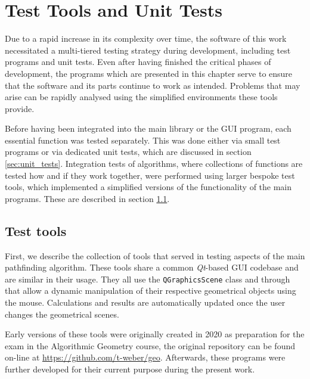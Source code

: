 %
%

\chapter{Test Tools and Unit Tests}
\label{ch:tests}
Due to a rapid increase in its complexity over time, the software of this work 
necessitated a multi-tiered testing strategy during development, including test programs and unit tests.
Even after having finished the critical phases of development, the programs which are 
presented in this chapter serve to ensure that the software and its parts continue to work as intended. 
Problems that may arise can be rapidly analysed using the simplified environments these tools provide.

Before having been integrated into the main library or the GUI program, each essential function was tested 
separately. This was done either via small test programs or via dedicated unit tests, which are discussed in 
section \ref{sec:unit_tests}.
Integration tests of algorithms, where collections of functions are tested how and if they work together, 
were performed using larger bespoke test tools, which implemented a simplified versions of the functionality 
of the main programs. These are described in section \ref{sec:tests_tools}.



\section{Test tools}
\label{sec:tests_tools}
First, we describe the collection of tools that served in testing aspects of the main pathfinding algorithm.
These tools share a common \textit{Qt}-based \cite{web_Qt} GUI codebase and are similar in their usage.
They all use the \lstinline[language=C++]|QGraphicsScene| class \cite{web_QGraphicsScene} and through that
allow a dynamic manipulation of their respective geometrical objects using the mouse. 
Calculations and results are automatically updated once the user changes the geometrical scenes.

Early versions of these tools were originally created in 2020 as preparation for the exam in the Algorithmic
Geometry course, the original repository can be found on-line at \url{https://github.com/t-weber/geo}. 
Afterwards, these programs were further developed for their current purpose during the present work.


